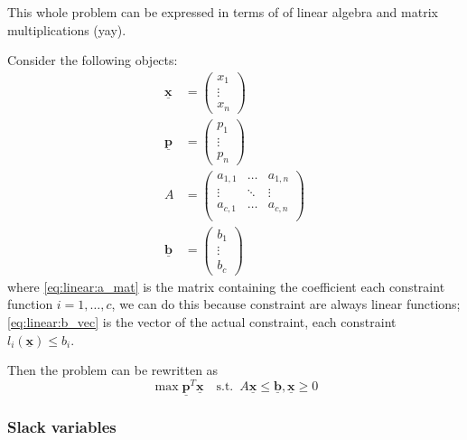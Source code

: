 \documentclass[12pt]{extarticle}
\renewcommand{\vec}[1]{\underline{\mathbf{#1}}}
\begin{document}
This whole problem can be expressed in terms of of linear algebra and matrix multiplications (yay).

Consider the following objects:
\begin{align}
    \vec x & = \begin{pmatrix}
                   x_1    \\
                   \vdots \\
                   x_n
               \end{pmatrix}                        \\
    \vec p & = \begin{pmatrix}
                   p_1    \\
                   \vdots \\
                   p_n
               \end{pmatrix}                        \\
    A      & = \begin{pmatrix}
                   a_{1,1} & \dots  & a_{1, n} \\
                   \vdots  & \ddots & \vdots   \\
                   a_{c,1} & \dots  & a_{c, n} \\
               \end{pmatrix} \label{eq:linear:a_mat} \\
    \vec b & = \begin{pmatrix}
                   b_1    \\
                   \vdots \\
                   b_c
               \end{pmatrix} \label{eq:linear:b_vec}
\end{align}
where \autoref{eq:linear:a_mat} is the matrix containing the coefficient each constraint function $i = 1, \ldots, c$, we can do this because constraint are always linear functions;
\autoref{eq:linear:b_vec} is the vector of the actual constraint, each constraint $l_i(\vec{x}) \leq b_i$.

Then the problem can be rewritten as
\begin{equation}
    \max \vec p^T \vec x \quad \text{s.t.} \enspace A \vec x \leq \vec b, \vec x \geq 0
\end{equation}

\subsubsection{Slack variables}
\end{document}
